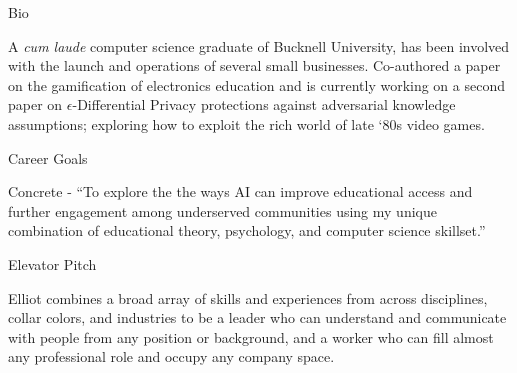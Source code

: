\documentclass{resume} %
\begin{document}
\begin{rSection}{Bio}

A \textit{cum laude} computer science graduate of Bucknell University, has been involved with the launch and operations of several small businesses. Co-authored a paper on the gamification of electronics education and is currently working on a second paper on $\epsilon$-Differential Privacy protections against adversarial knowledge assumptions; exploring how to exploit the rich world of late ‘80s video games.

\end{rSection}


\begin{rSection}{Career Goals}

Concrete - ``To explore the the ways AI can improve educational access and further engagement among underserved communities using my unique combination of educational theory, psychology, and computer science skillset.''

\end{rSection}


\begin{rSection}{Elevator Pitch}

Elliot combines a broad array of skills and experiences from across disciplines, collar colors, and industries to be a leader who can understand and communicate with people from any position or background, and a worker who can fill almost any professional role and occupy any company space.

\end{rSection}

\end{document}
